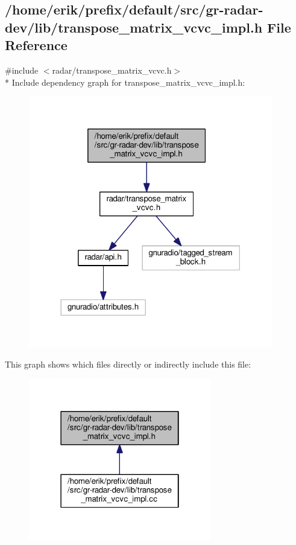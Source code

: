 \subsection{/home/erik/prefix/default/src/gr-\/radar-\/dev/lib/transpose\+\_\+matrix\+\_\+vcvc\+\_\+impl.h File Reference}
\label{transpose__matrix__vcvc__impl_8h}
{\ttfamily \#include $<$radar/transpose\+\_\+matrix\+\_\+vcvc.\+h$>$}\\*
Include dependency graph for transpose\+\_\+matrix\+\_\+vcvc\+\_\+impl.\+h\+:
\nopagebreak
\begin{figure}[H]
\begin{center}
\leavevmode
\includegraphics[width=302pt]{d8/da9/transpose__matrix__vcvc__impl_8h__incl}
\end{center}
\end{figure}
This graph shows which files directly or indirectly include this file\+:
\nopagebreak
\begin{figure}[H]
\begin{center}
\leavevmode
\includegraphics[width=226pt]{dc/d9c/transpose__matrix__vcvc__impl_8h__dep__incl}
\end{center}
\end{figure}
